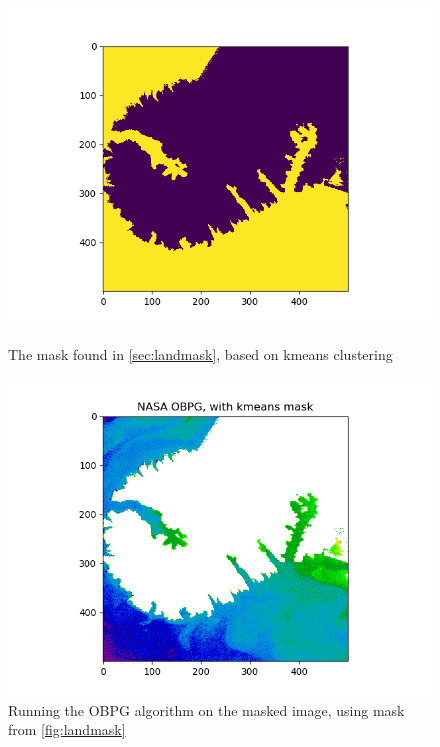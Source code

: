 \begin{figure}[h!]
    \begin{minipage}{.4\textwidth}
        \centering
        \includegraphics[width=\textwidth]{../fig/landmask.png}
        \caption{The mask found in \cref{sec:landmask}, based on kmeans clustering}
        \label{fig:landmask}
        \end{minipage}
    \begin{minipage}{.4\textwidth}
        \centering
        \includegraphics[width=1.5\textwidth]{../fig/NASA OBPG, with kmeans mask.png}
        \caption{Running the OBPG algorithm on the masked image, using mask from \cref{fig:landmask}}
        \label{fig:mask_obpg}
        \end{minipage}%
    \end{figure}



